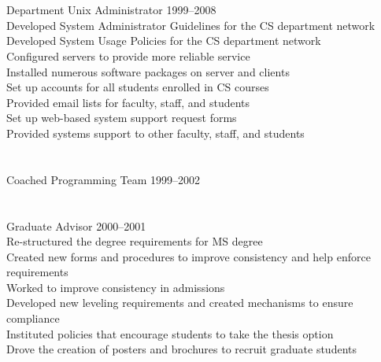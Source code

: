 \documentclass[12pt]{resume}
\begin{document}
\vspace*{-1.25\baselineskip}
\section{}{Department Unix Administrator 1999--2008}
{\\
  \hspace*{1em} Developed System Administrator Guidelines for the CS department network\\
  \hspace*{1em} Developed System Usage Policies for the CS department network\\
\hspace*{1em} Configured servers to provide more reliable service\\
\hspace*{1em} Installed numerous software packages on server and clients\\
\hspace*{1em} Set up accounts for all students enrolled in CS courses\\
\hspace*{1em} Provided email lists for faculty, staff, and students\\
\hspace*{1em} Set up web-based system support request forms\\
\hspace*{1em} Provided systems support to other faculty, staff, and students\\
}

\vspace*{-1.25\baselineskip}
\section{}{Coached Programming Team 1999--2002}{}

\vspace*{-1.25\baselineskip}
\section{}{Graduate Advisor 2000--2001}
{\\
\hspace*{1em} Re-structured the degree requirements for MS degree\\
\hspace*{1em} Created new forms and procedures to improve consistency and help enforce requirements\\
\hspace*{1em} Worked to improve consistency in admissions\\
\hspace*{1em} Developed new leveling requirements and created mechanisms to ensure compliance\\
\hspace*{1em} Instituted policies that encourage students to take the thesis option\\
\hspace*{1em} Drove the creation of posters and brochures to recruit graduate students\\
}
\end{document}
